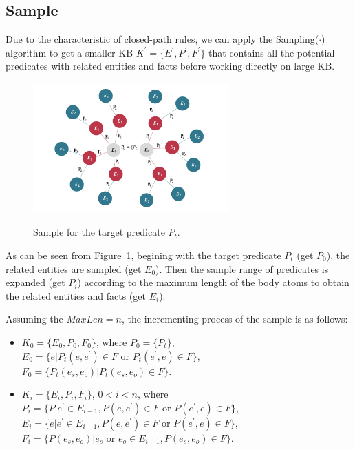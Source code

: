 \documentclass{article}
\begin{document}
	\subsection{Sample}  
	Due to the characteristic of closed-path rules, we can apply the \textsf{Sampling($\cdot$)} algorithm to get a smaller KB $K^{'}=\{E^{'}, P^{'}, F^{'}\}$ that contains all the potential predicates with related entities and facts before working directly on large KB. 
	\begin{figure}
		\centering
		\includegraphics[width=75mm]{sample.pdf}\\
		\caption{Sample for the target predicate $P_t$.}
		\label{fig:sample}
	\end{figure}
	As can be seen from Figure~\ref{fig:sample}, begining with the target predicate $P_t$ (get $P_0$), the related entities are sampled (get $E_0$). Then the sample range of predicates is expanded (get $P_i$) according to the maximum length of the body atoms to obtain the related entities and facts (get $E_i$). 
	
	Assuming the $MaxLen = n$, the incrementing process of the sample is as follows:
	\begin{itemize}
		\item $K_0=\{E_0, P_0, F_0\}$, where $P_0=\{P_t\}$, \\
		$E_0=\{e | P_t(e, e^{'}) \in F$ or $P_t(e^{'}, e) \in F\}$, \\
		$F_0=\{P_t(e_s,e_o) | P_t(e_s,e_o) \in F \}$.
		\item $K_i=\{E_i, P_i, F_i\}$, $0<i<n$, where \\
		$P_i=\{P|e^{'} \in E_{i-1}, P(e, e^{'})\in F$ or $P(e^{'},e)\in F\}$,\\
		$E_i=\{e|e^{'} \in E_{i-1}, P(e, e^{'})\in F$ or $P(e^{'},e)\in F\}$,\\
		$F_i=\{P(e_s, e_o)|e_s$ or $ e_o \in E_{i-1}, P(e_s, e_o)\in F\}$.
	\end{itemize}
	
\end{document}
